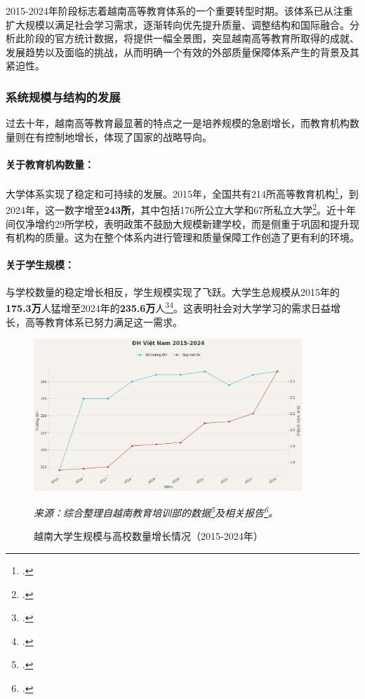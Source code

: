 2015-2024年阶段标志着越南高等教育体系的一个重要转型时期。该体系已从注重扩大规模以满足社会学习需求，逐渐转向优先提升质量、调整结构和国际融合。分析此阶段的官方统计数据，将提供一幅全景图，突显越南高等教育所取得的成就、发展趋势以及面临的挑战，从而明确一个有效的外部质量保障体系产生的背景及其紧迫性。

\subsubsection{系统规模与结构的发展}

过去十年，越南高等教育最显著的特点之一是培养规模的急剧增长，而教育机构数量则在有控制地增长，体现了国家的战略导向。

\paragraph{关于教育机构数量：}
大学体系实现了稳定和可持续的发展。2015年，全国共有214所高等教育机构\footcite{stat_quy_mo_2015_2021}，到2024年，这一数字增至\textbf{243所}，其中包括176所公立大学和67所私立大学\footcite{stat_moet_2024}。近十年间仅净增约29所学校，表明政策不鼓励大规模新建学校，而是侧重于巩固和提升现有机构的质量。这为在整个体系内进行管理和质量保障工作创造了更有利的环境。

\paragraph{关于学生规模：}
与学校数量的稳定增长相反，学生规模实现了飞跃。大学生总规模从2015年的\textbf{175.3万}人猛增至2024年的\textbf{235.6万}人\footcite{stat_moet_2024}\footcite{stat_quy_mo_2015_2021}。这表明社会对大学学习的需求日益增长，高等教育体系已努力满足这一需求。

\begin{figure}
    \centering
    \includegraphics[width=0.9\textwidth]{image/bieu do 1 luan giao duc.png} 
    \caption{越南大学生规模与高校数量增长情况（2015-2024年）}
    \label{fig:quy_mo_phat_trien}
    \vspace{0.2cm}
    \footnotesize{\textit{来源：综合整理自越南教育培训部的数据\footcite{stat_moet_2024}及相关报告\footcite{stat_quy_mo_2015_2021}。}}
\end{figure}

